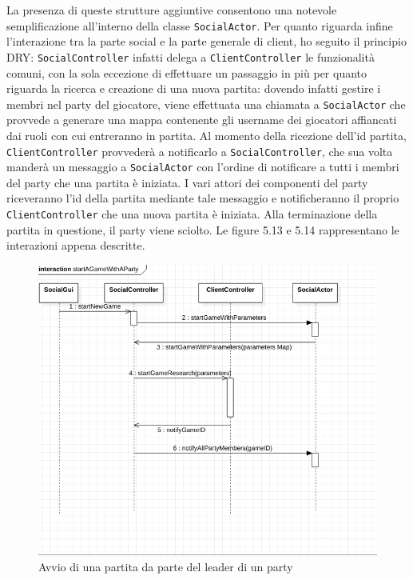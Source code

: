 La presenza di queste strutture aggiuntive consentono una notevole semplificazione all'interno della classe \texttt{SocialActor}.
Per quanto riguarda infine l'interazione tra la parte social e la parte generale di client, ho seguito il principio DRY: \texttt{SocialController} infatti delega a \texttt{ClientController} le funzionalità comuni, con la sola eccezione di effettuare un passaggio in più per quanto riguarda la ricerca e creazione di una nuova partita: dovendo infatti gestire i membri nel party del giocatore, viene effettuata una chiamata a \texttt{SocialActor} che provvede a generare una mappa contenente gli username dei giocatori affiancati dai ruoli con cui entreranno in partita.
Al momento della ricezione dell'id partita, \texttt{ClientController} provvederà a notificarlo a \texttt{SocialController}, che  sua volta manderà un messaggio a \texttt{SocialActor} con l'ordine di notificare a tutti i membri del party che una partita è iniziata. I vari attori dei componenti del party riceveranno l'id della partita mediante tale messaggio e notificheranno il proprio \texttt{ClientController} che una nuova partita è iniziata.
Alla terminazione della partita in questione, il party viene sciolto.
Le figure 5.13 e 5.14 rappresentano le interazioni appena descritte.

\begin{figure}[H]
	\includegraphics[width=\textwidth,height=\textheight,keepaspectratio]{socialStartGame}
	\caption{Avvio di una partita da parte del leader di un party}
\end{figure}

